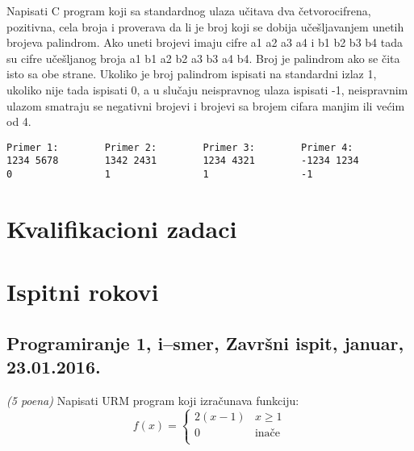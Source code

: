 \begin{Exercise}[label=v1.3_01] 
Napisati C program koji sa standardnog ulaza u\v citava dva \v
cetvorocifrena, pozitivna, cela broja i proverava da li je broj koji
se dobija u\v ce\v sljavanjem unetih brojeva palindrom. Ako uneti
brojevi imaju cifre a1 a2 a3 a4 i b1 b2 b3 b4 tada su cifre u\v ce\v
sljanog broja a1 b1 a2 b2 a3 b3 a4 b4. Broj je palindrom ako se \v
cita isto sa obe strane. Ukoliko je broj palindrom ispisati na
standardni izlaz 1, ukoliko nije tada ispisati 0, a u slu\v caju
neispravnog ulaza ispisati -1, neispravnim ulazom smatraju se
negativni brojevi i brojevi sa brojem cifara manjim ili ve\' cim od 4.
\begin{center}
\begin{verbatim}
Primer 1:        Primer 2:        Primer 3:        Primer 4:
1234 5678        1342 2431        1234 4321        -1234 1234
0                1                1                -1
\end{verbatim}
\end{center}
\end{Exercise}
\begin{Answer}[ref=v1.3_01]
\end{Answer}


\section{Kvalifikacioni zadaci}

\section{Ispitni rokovi}

\subsection{Programiranje 1, i--smer, Zavr\v{s}ni ispit, januar, 23.01.2016.}

\begin{Exercise}[label=v1.3_01] 
{\em (5 poena)}  Napisati URM program koji izra\v cunava funkciju:
    $$ f(x)= \begin{cases}
                  2(x - 1) & x \geq 1 \\
                  0 & \text{ina\v ce} \\
                  \end{cases}  $$
\end{Exercise}
\begin{Answer}[ref=v1.3_01]
\end{Answer}


